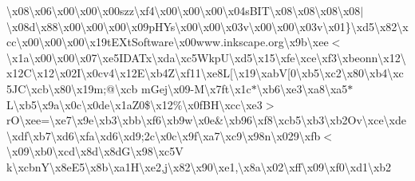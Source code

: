 \begin{DoxyCompactItemize}
\textbackslash{}x08\textbackslash{}x06\textbackslash{}x00\textbackslash{}x00\textbackslash{}x00szz\textbackslash{}xf4\textbackslash{}x00\textbackslash{}x00\textbackslash{}x00\textbackslash{}x04s\+B\+I\+T\textbackslash{}x08\textbackslash{}x08\textbackslash{}x08\textbackslash{}x08$\vert$\textbackslash{}x08d\textbackslash{}x88\textbackslash{}x00\textbackslash{}x00\textbackslash{}x00\textbackslash{}x09p\+H\+Ys\textbackslash{}x00\textbackslash{}x00\textbackslash{}x03v\textbackslash{}x00\textbackslash{}x00\textbackslash{}x03v\textbackslash{}x01\}\textbackslash{}xd5\textbackslash{}x82\textbackslash{}xcc\textbackslash{}x00\textbackslash{}x00\textbackslash{}x00\textbackslash{}x19t\+E\+Xt\+Software\textbackslash{}x00www.\+inkscape.\+org\textbackslash{}x9b\textbackslash{}xee$<$\textbackslash{}x1a\textbackslash{}x00\textbackslash{}x00\textbackslash{}x07\textbackslash{}xe5\+I\+D\+A\+Tx\textbackslash{}xda\textbackslash{}xc5\+Wkp\+U\textbackslash{}xd5\textbackslash{}x15\textbackslash{}xfe\textbackslash{}xce\textbackslash{}xf3\textbackslash{}xbeonn\textbackslash{}x12\textbackslash{}x12\+C\textbackslash{}x12\textbackslash{}x02\+I\textbackslash{}x0cv4\textbackslash{}x12\+E\textbackslash{}xb4\+Z\textbackslash{}xf11\textbackslash{}xe8\+L\mbox{[}\textbackslash{}x19\textbackslash{}xab\+V\mbox{[}0\textbackslash{}xb5\textbackslash{}xc2\textbackslash{}x80\textbackslash{}xb4\textbackslash{}xc5\+J\+C\textbackslash{}xcb\textbackslash{}x80\textbackslash{}x19m;@\textbackslash{}xcb m\+Gej\textbackslash{}x09-\/\+M\textbackslash{}x7ft\textbackslash{}x1c$\ast$\textbackslash{}xb6\textbackslash{}xe3\textbackslash{}xa8\textbackslash{}xa5$\ast$\+L\textbackslash{}xb5\textbackslash{}x9a\textbackslash{}x0c\textbackslash{}x0de\textbackslash{}x1a\+Z0\$\textbackslash{}x12\%\textbackslash{}x0f\+B\+H\textbackslash{}xcc\textbackslash{}xe3$>$r\+O\textbackslash{}xee=\textbackslash{}xe7\textbackslash{}x9e\textbackslash{}xb3\textbackslash{}xbb\textbackslash{}xf6\textbackslash{}xb9w\textbackslash{}x0e\&\textbackslash{}xb96\textbackslash{}xf8\textbackslash{}xcb5\textbackslash{}xb3\textbackslash{}xb2\+Ov\textbackslash{}xce\textbackslash{}xde\textbackslash{}xdf\textbackslash{}xb7\textbackslash{}xd6\textbackslash{}xfa\textbackslash{}xd6\textbackslash{}xd9;2c\textbackslash{}x0c\textbackslash{}x9f\textbackslash{}xa7\textbackslash{}xc9\textbackslash{}x98n\textbackslash{}x029\textbackslash{}xfb$<$\textbackslash{}x09\textbackslash{}xb0\textbackslash{}xcd\textbackslash{}x8d\textbackslash{}x8d\+G\textbackslash{}x98\textbackslash{}xc5\+V k\textbackslash{}xcbn\+Y\textbackslash{}x8e\+E5\textbackslash{}x8b\textbackslash{}xa1\+H\textbackslash{}xe2,j\textbackslash{}x82\textbackslash{}x90\textbackslash{}xe1,\textbackslash{}x8a\textbackslash{}x02\textbackslash{}xff\textbackslash{}x09\textbackslash{}xf0\textbackslash{}xd1\textbackslash{}xb2 
\end{DoxyCompactItemize}
